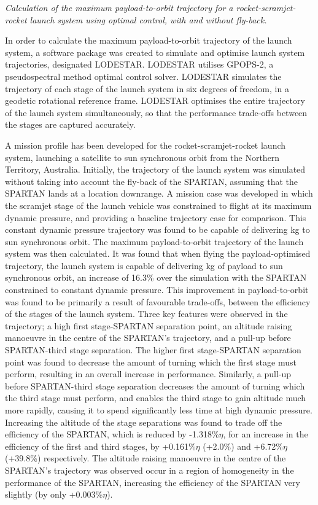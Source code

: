 	\vspace{10pt}
\emph{Calculation of the maximum payload-to-orbit trajectory for a rocket-scramjet-rocket launch system using optimal control, with and without fly-back.}

In order to calculate the maximum payload-to-orbit trajectory of the launch system, a software package was created to simulate and optimise launch system trajectories, designated LODESTAR. LODESTAR utilises GPOPS-2, a pseudospectral method optimal control solver. LODESTAR simulates the trajectory of each stage of the launch system in six degrees of freedom, in a geodetic rotational reference frame. 
LODESTAR optimises the entire trajectory of the launch system simultaneously, so that the performance trade-offs between the stages are captured accurately.

A mission profile has been developed for the rocket-scramjet-rocket launch system, launching a satellite to sun synchronous orbit from the Northern Territory, Australia. 
Initially, the trajectory of the launch system was simulated without taking into account the fly-back of the SPARTAN, assuming that the SPARTAN lands at a location downrange.
A mission case was developed in which the scramjet stage of the launch vehicle was constrained to flight at its maximum dynamic pressure, and providing a baseline trajectory case for comparison. This constant dynamic pressure trajectory was found to be capable of delivering \PayloadToOrbitConstq kg to sun synchronous orbit. 
The maximum payload-to-orbit trajectory of the launch system was then calculated. It was found that when flying the payload-optimised trajectory, the launch system is capable of delivering \PayloadToOrbitStandardNoReturn kg of payload to sun synchronous orbit, an increase of 16.3\% over the simulation with the SPARTAN constrained to constant dynamic pressure. 
This improvement in payload-to-orbit was found to be primarily a result of favourable trade-offs, between the efficiency of the stages of the launch system.
Three key features were observed in the trajectory; a high first stage-SPARTAN separation point, an altitude raising manoeuvre in the centre of the SPARTAN's trajectory, and a pull-up before SPARTAN-third stage separation. 
The higher first stage-SPARTAN separation point was found to decrease the amount of turning which the first stage must perform, resulting in an overall increase in performance. Similarly, a pull-up before SPARTAN-third stage separation decreases the amount of turning which the third stage must perform, and enables the third stage to gain altitude much more rapidly, causing it to spend significantly less time at high dynamic pressure. 
 Increasing the altitude of the stage separations was found to trade off the efficiency of the SPARTAN, which is reduced by -1.318\%$\eta$, for an increase in the efficiency of the first and third stages, by +0.161\%$\eta$ (+2.0\%) and +6.72\%$\eta$ (+39.8\%) respectively.
The altitude raising manoeuvre in the centre of the SPARTAN's trajectory was observed occur in a region of homogeneity in the performance of the SPARTAN, increasing the efficiency of the SPARTAN very slightly (by only +0.003\%$\eta$).


